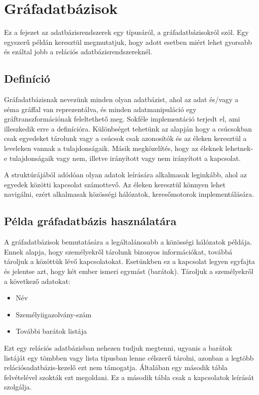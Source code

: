 \chapter{Gráfadatbázisok}

Ez a fejezet az adatbázisrendszerek egy típusáról, a gráfadatbázisokról szól. Egy egyszerű példán keresztül megmutatjuk, hogy adott esetben miért lehet gyorsabb és ezáltal jobb a relációs adatbázisrendszereknél.

\section{Definíció}

Gráfadatbázisnak nevezünk minden olyan adatbázist, ahol az adat és/vagy a séma gráffal van reprezentálva, és minden adatmanipuláció egy gráftranszformációnak feleltethető meg.\cite{angles2008survey} Sokféle implementáció terjedt el, ami illeszkedik erre a definícióra. Különbséget tehetünk az alapján hogy a csúcsokban csak egyedeket tárolunk vagy a csúcsok csak azonosítók és az éleken keresztül a leveleken vannak a tulajdonságaik. Másik megközelítés, hogy az éleknek lehetnek-e tulajdonságaik vagy nem, illetve irányított vagy nem irányított a kapcsolat. 

A struktúrájából adódóan olyan adatok leírására alkalmasak leginkább, ahol az egyedek közötti kapcsolat számottevő.\cite{Neo4JGraphDatabase} Az éleken keresztül könnyen lehet navigálni, ezért alkalmasak közösségi hálózatok, keresőmotorok implementálására. 

\section{Példa gráfadatbázis használatára}

A gráfadatbázisok bemutatására a legáltalánosabb a közösségi hálózatok példája. Ennek alapja, hogy személyekről tárolunk bizonyos információkat, továbbá tároljuk a közöttük lévő kapcsolatokat. Esetünkben ez a kapcsolat legyen egyfajta és jelentse azt, hogy két ember ismeri egymást (barátok). Tároljuk a személyekről a következő adatokat:
\begin{itemize}
	\item Név
	\item Személyiigazolvány-szám
	\item További barátok listája
\end{itemize} 
Ezt egy relációs adatbázisban nehezen tudjuk megtenni, ugyanis a barátok listáját egy tömbben vagy lista típusban lenne célszerű tárolni, azonban a legtöbb relációsadatbázis-kezelő ezt nem támogatja. Általában egy második tábla felvételével szokták ezt megoldani. Ez a második tábla csak a kapcsolatok leírását szolgálja.

